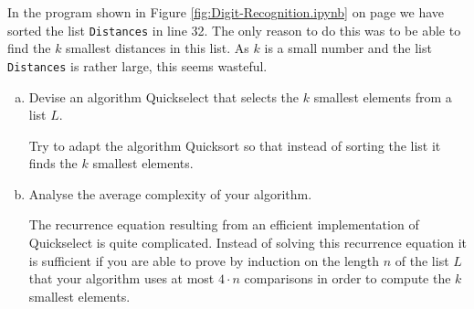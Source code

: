 \exercise
In the program shown in Figure \ref{fig:Digit-Recognition.ipynb} on page \pageref{fig:Digit-Recognition.ipynb}
we have sorted the list \texttt{Distances} in line 32.  The only reason to do this was to be able to find the $k$ smallest
distances in this list.  As $k$ is a small number and the list \texttt{Distances} is rather large, this seems wasteful.
\begin{enumerate}[(a)]
\item Devise an algorithm Quickselect that selects the $k$ smallest elements from a list $L$.

      \hint
      Try to adapt the algorithm Quicksort so that instead of sorting the list it finds the $k$ smallest elements.      
\item Analyse the average complexity of your algorithm.

      \hint
      The recurrence equation resulting from an efficient implementation of Quickselect is quite complicated.
      Instead of solving this recurrence equation it is sufficient if you are able to prove by induction on the
      length $n$ of the list $L$ that your algorithm uses at most $4 \cdot n$ comparisons in order to compute
      the $k$ smallest elements.
      \eox
\end{enumerate}   
\pagebreak

